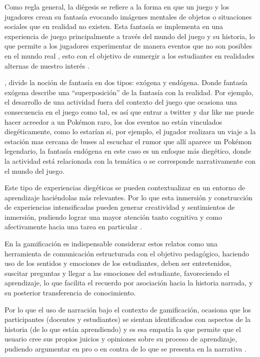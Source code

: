 Como regla general, la diégesis se refiere a la forma en que un juego y los jugadores crean su fantasía
evocando imágenes mentales de objetos o situaciones sociales que en realidad no existen. Esta fantasía se 
implementa en una experiencia de juego principalmente a través del mundo del juego y su historia, lo que 
permite a los jugadores experimentar de manera eventos que no son posibles en el mundo real
\cite{PRESTOPNIK2015492}, esto con el objetivo de sumergir a los estudiantes en realidades alternas de 
nuestro interés \cite{AURA2021101728}.

, divide la noción de fantasía en dos tipos: exógena y endógena. Donde fantasía
exógena describe una ``superposición'' de la fantasía con la realidad. Por ejemplo, el desarrollo de una
actividad fuera del contexto del juego que ocasiona una consecuencia en el juego como tal, es así que entrar
a twitter y dar like me puede hacer acreedor a un Pokémon raro, los dos eventos no están vinculados 
diegéticamente, como lo estarían si, por ejemplo, el jugador realizara un viaje a la estación mas cercana 
de buses al escuchar el rumor que allí aparece un Pokémon legendario, la fantasía endógena en este caso es 
un enfoque más diegético, donde la actividad está relacionada con la temática o se corresponde
narrativamente con el mundo del juego.

Este tipo de experiencias diegéticas se pueden contextualizar en un entorno de aprendizaje haciéndolas más 
relevantes. Por lo que esta inmersión y construcción de experiencias intensificadas pueden generar 
creatividad y sentimientos de inmersión, pudiendo lograr una mayor atención tanto cognitiva y como 
afectivamente hacia una tarea en particular \cite{AURA2021101728}.

En la gamificación es indispensable considerar estos relatos como una herramienta de comunicación estructurada
con el objetivo pedagógico, haciendo uso de los sentidos y emociones de los estudiantes, deben ser 
entretenidos, suscitar preguntas y llegar a las emociones del estudiante, favoreciendo el aprendizaje, lo que 
facilita el recuerdo por asociación hacia la historia narrada, y su posterior transferencia de conocimiento.

Por lo que el uso de narración bajo el contexto de gamificación, ocasiona que los participantes (docentes y
estudiantes) se sientan identificados con aspectos de la historia (de lo que están aprendiendo) y es esa
empatía la que permite que el usuario cree sus propios juicios y opiniones sobre su proceso de aprendizaje,
pudiendo argumentar en pro o en contra de lo que se presenta en la narrativa \cite{tornero2016ideas}.

